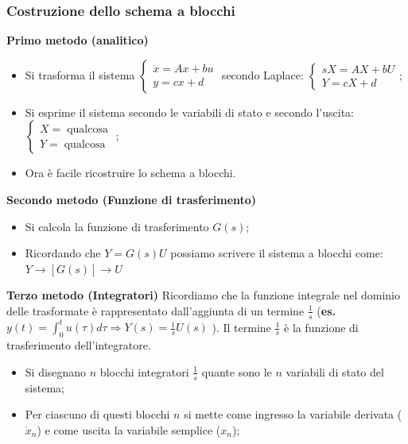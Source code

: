 \begin{landscape}
    \subsubsection*{Costruzione dello schema a blocchi}
    \textbf{Primo metodo (analitico)}
    \begin{itemize}
        \item Si trasforma il sistema $\begin{cases}
            \dot{x} = A x + bu\\ y = cx +d
        \end{cases}$ secondo Laplace: $\begin{cases}
            s X = A X + b U\\ Y = c X + d
        \end{cases}$;
        \item Si esprime il sistema secondo le variabili di stato e secondo l'uscita:$\begin{cases}
            X = \;\text{qualcosa}\;\\ Y = \;\text{qualcosa}\;
        \end{cases}$;
        \item Ora è facile ricostruire lo schema a blocchi.
    \end{itemize}
    \textbf{Secondo metodo (Funzione di trasferimento)}
    \begin{itemize}
        \item Si calcola la funzione di trasferimento $G(s)$;
        \item Ricordando che $Y = G(s) U$ possiamo scrivere il sistema a blocchi come: $Y \longrightarrow \left[G(s)\right] \longrightarrow U$
    \end{itemize}
    \textbf{Terzo metodo (Integratori)}\newline
    Ricordiamo che la funzione integrale nel dominio delle trasformate è rappresentato dall'aggiunta di un termine $\frac{1}{s}$ (\textbf{es.} $y(t) = \int_{0}^{t}u(\tau)d \tau \Rightarrow Y(s) = \frac{1}{s} U(s)$ ).\newline
    Il termine $\frac{1}{s}$ è la funzione di trasferimento dell'integratore.
    \begin{itemize}
        \item Si disegnano $n$ blocchi integratori $\frac{1}{s}$ quante sono le $n$ variabili di stato del sistema;
        \item Per ciascuno di questi blocchi $n$ si mette come ingresso la variabile derivata ($\dot{x}_n$) e come uscita la variabile semplice ($x_n$);

\end{itemize}
\end{landscape}
